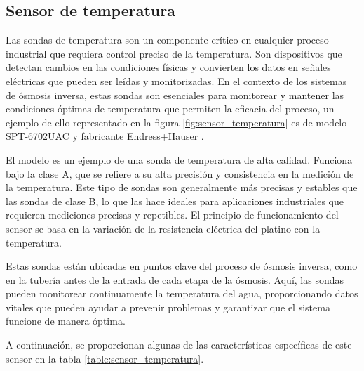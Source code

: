 \subsection{Sensor de temperatura} \label{sec:sensor_temp}

Las sondas de temperatura son un componente crítico en cualquier proceso industrial que requiera control preciso
de la temperatura. Son dispositivos que detectan cambios en las condiciones físicas y convierten los datos en
señales eléctricas que pueden ser leídas y monitorizadas. En el contexto de los sistemas de ósmosis inversa,
estas sondas son esenciales para monitorear y mantener las condiciones óptimas de temperatura que permiten la
eficacia del proceso, un ejemplo de ello representado en la figura \ref{fig:sensor_temperatura} es de modelo SPT-6702UAC y fabricante Endress+Hauser .

El modelo es un ejemplo de una sonda de temperatura de alta calidad. Funciona bajo
la clase A, que se refiere a su alta precisión y consistencia en la medición de la temperatura.
Este tipo de sondas son generalmente más precisas y estables que las sondas de clase B, lo que
las hace ideales para aplicaciones industriales que requieren mediciones precisas y repetibles. El principio de funcionamiento del
sensor se basa en la variación de la resistencia eléctrica del platino con la temperatura.

Estas sondas están ubicadas en puntos clave del proceso de ósmosis inversa, como en la tubería antes de la
entrada de cada etapa de la ósmosis. Aquí, las sondas pueden monitorear continuamente la temperatura del agua,
proporcionando datos vitales que pueden ayudar a prevenir problemas y garantizar que el sistema funcione de manera óptima.


A continuación, se proporcionan algunas de las características específicas de este sensor en la tabla \ref{table:sensor_temperatura}.


